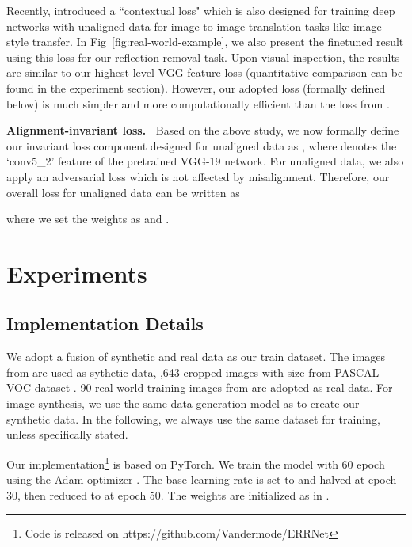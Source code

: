 \documentclass[10pt,twocolumn,letterpaper]{article}
\begin{document}
Recently, \cite{Mechrez_2018_ECCV} introduced a ``contextual loss" which is also designed for training deep networks with unaligned data for image-to-image translation tasks like image style transfer. In Fig~\ref{fig:real-world-example}, we also present the finetuned result using this loss for our reflection removal task. Upon visual inspection, the results are similar to our highest-level VGG feature loss (quantitative comparison can be found in the experiment section). However, our adopted loss (formally defined below) is much simpler and more computationally efficient than the loss from \cite{Mechrez_2018_ECCV}.

\vspace{6pt}
\noindent\textbf{Alignment-invariant loss.~}
Based on the above study, we now formally define our invariant loss component designed for unaligned data as , where  denotes the `conv5\_2' feature of the pretrained VGG-19 network.  For unaligned data, we also apply an adversarial loss which is not affected by misalignment. Therefore, our overall loss for unaligned data can be written as

where we set the weights as  and .





\section{Experiments}\label{sec:experiments}



\subsection{Implementation Details} \label{sec:implement}
 We adopt a fusion of synthetic and real data as
our train dataset. The images from  \cite{fan2017generic} are used as
sythetic data, ,643 cropped images with size  from PASCAL
VOC dataset \cite{everingham2010pascal}. 90 real-world training images from
\cite{zhang2018single} are adopted as real data. For image synthesis, we use the
same data generation model as \cite{fan2017generic} to create our synthetic
data. In the following, we always use the same dataset for training, unless
specifically stated. 

\vspace{5pt}
 Our implementation\footnote{Code is released on https://github.com/Vandermode/ERRNet} is based on PyTorch. We train the model with 60
epoch using the Adam optimizer \cite{kingma2014adam}. The
base learning rate is set to  and halved at epoch 30, then reduced to
 at epoch 50. The weights are initialized as in
\cite{Lim_2017_CVPR_Workshops}.
 
\end{document}
